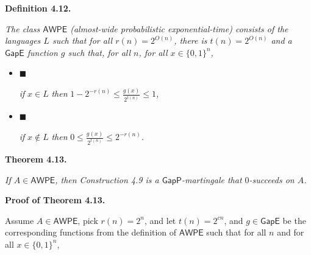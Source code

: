 

\par\medskip\noindent\textbf{
\textbf{Definition 4.12}\textbf{.}
}\par



\emph{The class $\mathsf{AWPE}$ (almost-wide probabilistic exponential-time) consists of
the languages $L$ such that for all $r(n)=2^{O(n)}$, there is $t(n)=2^{O(n)}$ and a $\mathsf{GapE}$
function $g$ such that, for all $n$, for all $x\in\{0,1\}^{n}$,}\par


\begin{itemize}


\item[] 
$\blacksquare$ 


\emph{if }$x\in L$\emph{ then }$1-2^{-r(n)}\leq\frac{g(x)}{2^{t(n)}}\leq 1$\emph{,}\par





\item[] 
$\blacksquare$ 


\emph{if }$x\not\in L$\emph{ then }$0\leq\frac{g(x)}{2^{t(n)}}\leq 2^{-r(n)}$\emph{.}\par





\end{itemize}







\par\medskip\noindent\textbf{
\textbf{Theorem 4.13}\textbf{.}
}\par



\emph{If $A\in\mathsf{AWPE}$, then Construction 4.9 is a $\mathsf{GapP}$-martingale that $0$-succeeds on $A$.}\par







\par\medskip\noindent\textbf{Proof of Theorem 4.13.}\par




Assume $A\in\mathsf{AWPE}$, pick $r(n)=2^{n}$, and let $t(n)=2^{cn}$, and $g\in\mathsf{GapE}$ be the corresponding functions from the definition of $\mathsf{AWPE}$ such that for all $n$ and for all $x\in\{0,1\}^{n}$,\par


